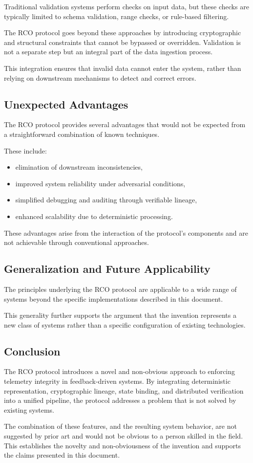 Traditional validation systems perform checks on input data, but these checks are typically limited to schema validation, range checks, or rule-based filtering.

The RCO protocol goes beyond these approaches by introducing cryptographic and structural constraints that cannot be bypassed or overridden. Validation is not a separate step but an integral part of the data ingestion process.

This integration ensures that invalid data cannot enter the system, rather than relying on downstream mechanisms to detect and correct errors.

\subsection{Unexpected Advantages}

The RCO protocol provides several advantages that would not be expected from a straightforward combination of known techniques.

These include:

\begin{itemize}
\item elimination of downstream inconsistencies,
\item improved system reliability under adversarial conditions,
\item simplified debugging and auditing through verifiable lineage,
\item enhanced scalability due to deterministic processing.
\end{itemize}

These advantages arise from the interaction of the protocol’s components and are not achievable through conventional approaches.

\subsection{Generalization and Future Applicability}

The principles underlying the RCO protocol are applicable to a wide range of systems beyond the specific implementations described in this document.

This generality further supports the argument that the invention represents a new class of systems rather than a specific configuration of existing technologies.

\subsection{Conclusion}

The RCO protocol introduces a novel and non-obvious approach to enforcing telemetry integrity in feedback-driven systems. By integrating deterministic representation, cryptographic lineage, state binding, and distributed verification into a unified pipeline, the protocol addresses a problem that is not solved by existing systems.

The combination of these features, and the resulting system behavior, are not suggested by prior art and would not be obvious to a person skilled in the field. This establishes the novelty and non-obviousness of the invention and supports the claims presented in this document.